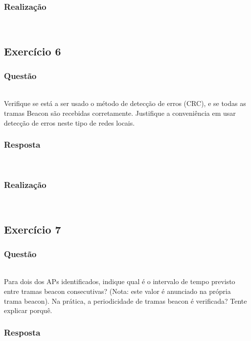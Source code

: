 \documentclass{llncs}
\begin{document}
\subsubsection{Realização}\rule[-10pt]{0pt}{10pt}\\



\clearpage
\subsection{Exercício 6}
\subsubsection{Questão}\rule[-10pt]{0pt}{10pt}\\

Verifique se está a ser usado o método de detecção de erros (CRC), e se todas as tramas Beacon são recebidas corretamente. Justifique a conveniência em usar detecção de erros neste tipo de redes locais.

\subsubsection{Resposta}\rule[-10pt]{0pt}{10pt}\\



\subsubsection{Realização}\rule[-10pt]{0pt}{10pt}\\



\clearpage
\subsection{Exercício 7}
\subsubsection{Questão}\rule[-10pt]{0pt}{10pt}\\

Para dois dos APs identificados, indique qual é o intervalo de tempo previsto entre tramas beacon consecutivas? (Nota: este valor é anunciado na própria trama beacon). Na prática, a periodicidade de tramas beacon é verificada? Tente explicar porquê.

\subsubsection{Resposta}\rule[-10pt]{0pt}{10pt}\\
\end{document}
